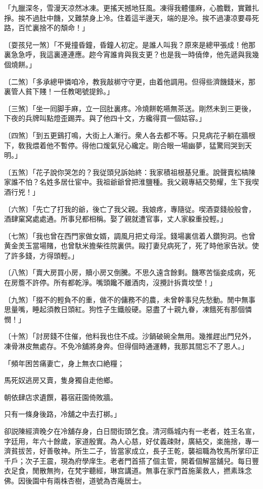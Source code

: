 \begin{myquote}
「九臘深冬，雪漫天凉然冰凍。更搖天撼地狂風。凍得我體僵麻，心膽戰，實難扎掙。挨不過肚中饑，又難禁身上冷。住着這半邊天，端的是冷。挨不過凄凉要尋死路，百忙裏捨不的頽命！」

{\markfont〔耍孩兒一煞〕}「不覺撞昏鐘，昏鐘人初定。是誰人叫我？原來是總甲張成！他那裏急急呼，我這裏連連應。趂今宵誰肯與我支更？也是我一時僥倖，他先遞與我幾個燒餅。」

{\markfont〔二煞〕}「多承總甲憐咱冷，教我敲梆守守更，由着他調用。但得些濟饑錢米，那裏管人貧下賤！一任教喝號提鈴。」

{\markfont〔三煞〕}「坐一囘脚手麻，立一回肚裏疼。冷燒餅乾嚥無茶送。剛然未到三更後，下夜的兵牌叫點燈歪踢弄。與了他四十文，方纔得買一個姑容。」

{\markfont〔四煞〕}「到五更鷄打鳴，大街上人漸行。衆人各去都不等。只見病花子躺在牆根下，敎我煨着他不暫停。得他口煖氣兒心纔定。剛合眼一場幽夢，猛驚囘哭到天明。」

{\markfont〔五煞〕}「花子說你哭怎的？我従頭兒訴始終：我家積祖根基兒重。說聲賣松槁陳家誰不怕？名姓多居仕宦中。我祖爺爺曾把淮鹽種。我父親專結交勢耀，生下我喫酒行兇！」

{\markfont〔六煞〕}「先亡了打我的爺，後亡了我父親。我娘疼，專隨従。喫酒耍錢般般會，酒肆窠窝處處通。所事兒都相稱。娶了親就遭官事，丈人家躱重投輕。」

{\markfont〔七煞〕}「我也曾在西門家做女婿，調風月把丈母淫。錢場裏信着人鑽狗洞。也曾黄金羙玉當場賭，也曾馱米擔柴徃院裏供。毆打妻兒病死了，死了時他家告狀。使了許多錢，方得頭輕。」

{\markfont〔八煞〕}「賣大房買小房，贖小房又倒騰。不思久遠含餘剩。饑寒苦惱妾成病，死在房簷不許停。所有都乾淨。嘴頭饞不離酒肉，沒攪計拆賣坟塋！」

{\markfont〔九煞〕}「掇不的輕負不的重，做不的傭務不的農，未曾幹事兒先愁動。閒中無事思量嘴，睡起須教日頭紅。狗性子生鐵般硬。惡盡了十親九眷，凍餓死有那個憐憫！」

{\markfont〔十煞〕}「討房錢不住催，他料我也住不成。沙鍋破碗全無用。幾推趕出門兒外，凍骨淋皮無處存。不免冷舖將身奔。但得個時通運轉，我那其間忘不了恩人。」

「頻年困苦痛妻亡，身上無衣口絶糧；

馬死奴逃房又賣，隻身獨自走他鄉。

朝依肆店求遺饌，暮宿莊園倚敗牆。

只有一條身後路，冷舖之中去打梆。」
\end{myquote}

卻説陳經濟晚夕在冷舖存身，白日間街頭乞食。清河縣城内有一老者，姓王名宣，字廷用，年六十餘歲，家道殷實。為人心慈，好仗義疎財，廣結交，楽施捨，專一濟貧拔苦，好善敬神。所生二子，皆當家成立，長子王乾，襲祖職為牧馬所掌印正千戶；次子王震，現為府學庠生。老者門首搭了個主管，開着個解當舖兒。每日豐衣足食，閒散無拘，在梵宇聽經，琳宫講道。無事在家門首施薬救人，撚素珠念佛。因後園中有兩株杏樹，道號為杏庵居士。

